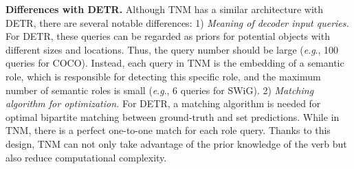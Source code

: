 \documentclass[letterpaper]{article} %
\newcommand{\eg}{\textit{e}.\textit{g}.}
\begin{document}





\noindent\textbf{Differences with DETR.} Although TNM has a similar architecture with DETR, there are several notable differences: 1) \emph{Meaning of decoder input queries.} For DETR, these queries can be regarded as priors for potential objects with different sizes and locations. Thus, the query number should be large (\eg, 100 queries for COCO). Instead, each query in TNM is the embedding of a semantic role, which is responsible for detecting this specific role, and the maximum number of semantic roles is small (\eg, 6 queries for SWiG). 2) \emph{Matching algorithm for optimization.} For DETR, a matching algorithm is needed for optimal bipartite matching between ground-truth and set predictions. While in TNM, there is a perfect one-to-one match for each role query. Thanks to this design, TNM can not only take advantage of the prior knowledge of the verb but also reduce computational complexity.
\end{document}
